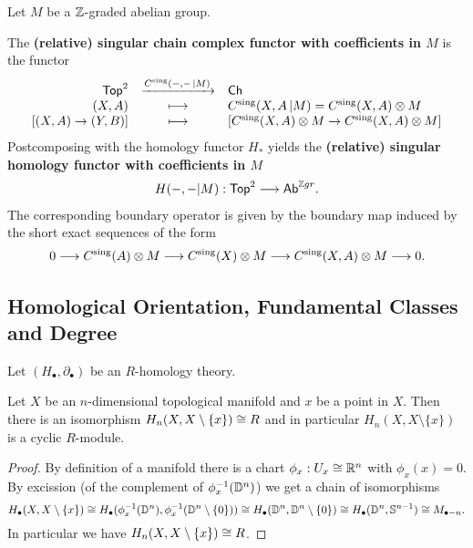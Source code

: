 	\begin{definition}
		Let $M$ be a $\mathbb{Z}$-graded abelian group.

		The \textbf{(relative) singular chain complex functor with coefficients in $M$} is the functor
		\begin{equation*}
			\begin{array}{rcl}
				\textsf{Top}^2 & \xrightarrow{C^\text{sing}(-,- \,| M)} & \textsf{Ch}\\
				(X,A) & \longmapsto & C^\text{sing}(X,A \,| M) = C^\text{sing}(X,A) \otimes M\\
				{[(X,A)\rightarrow(Y,B)]} & \longmapsto & {[C^\text{sing}(X,A) \otimes M \rightarrow C^\text{sing}(X,A) \otimes M]}
			\end{array}
		\end{equation*}
		Postcomposing with the homology functor $H_{*}$ yields the \textbf{(relative) singular homology functor with coefficients in $M$}
		\begin{align*}
			H(-,- | M): \textsf{Top}^2 --> \textsf{Ab}^{\mathbb{Z} gr}.
		\end{align*}
		The corresponding boundary operator is given by the boundary map induced by the short exact sequences of the form
		\begin{align*}
			0 --> C^\text{sing}(A) \otimes M --> C^\text{sing}(X) \otimes M --> C^\text{sing}(X,A) \otimes M --> 0.
		\end{align*}
	\end{definition}




	\newpage
	\subsection{Homological Orientation, Fundamental Classes and Degree}

	\begin{lemma}
		Let $(H_\bullet,\partial_\bullet)$ be an $R$-homology theory.

		Let $X$ be an $n$-dimensional topological manifold and $x$ be a point in $X$. Then there is an isomorphism $H_n(X,X\setminus \{x\}) \cong R$ and in particular $H_n(X,X\setminus \{x\})$ is a cyclic $R$-module.
	\end{lemma}
	\begin{proof}
		By definition of a manifold there is a chart $\phi_x: U_x \cong \mathbb{R}^n$ with $\phi_x(x) = 0$. By excission (of the complement of $\phi_x^{-1}(\mathbb{D}^n)$) we get a chain of isomorphisms
		\begin{equation*}
			H_\bullet(X,X\setminus\{x\}) \cong H_\bullet(\phi_x^{-1}(\mathbb{D}^n),\phi_x^{-1}(\mathbb{D}^n\setminus \{0\})) \cong H_\bullet(\mathbb{D}^n,\mathbb{D}^n\setminus \{0\}) \cong H_\bullet(\mathbb{D}^n,\mathbb{S}^{n-1}) \cong M_{\bullet-n}.
		\end{equation*}
		In particular we have $H_n(X,X\setminus\{x\}) \cong R$. 
	\end{proof}

